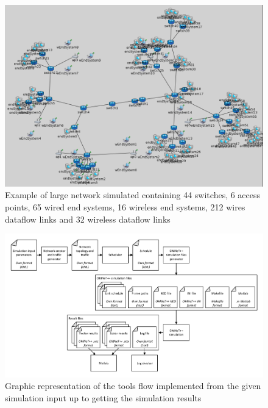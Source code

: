 \documentclass[conference]{IEEEtran}
\begin{document}





\begin{figure}[h]
	\centerline{\includegraphics[keepaspectratio=true, width=16cm] {figures/s1-3}}
	\caption{Example of large network simulated containing 44 switches, 6 access points, 65 wired end systems, 16 wireless end systems, 212 wires dataflow links and 32 wireless dataflow links}
	\label{fig:s1-3}
\end{figure}

\begin{figure}[h]
	\centerline{\includegraphics[keepaspectratio=true, width=16cm] {figures/toolchain-architecture}}
	\caption{Graphic representation of the tools flow implemented from the given simulation input up to getting the simulation results}
	\label{fig:toolchain-architecture}
\end{figure}
\end{document}
